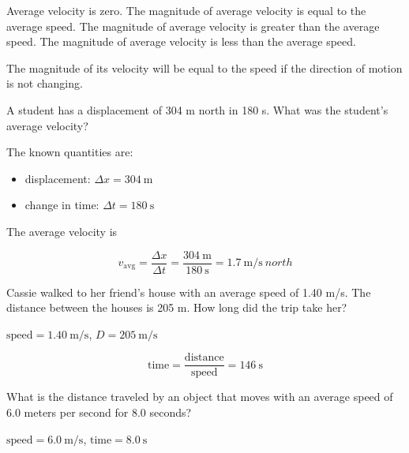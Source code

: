 \documentclass[]{exam}
\begin{document}
\begin{questions}
\begin{choices}
\choice Average velocity is zero.
\CorrectChoice The magnitude of average velocity is equal to the average speed.
\choice The magnitude of average velocity is greater than the average speed.
\choice The magnitude of average velocity is less than the average speed.
\end{choices}

\begin{solution}
The magnitude of its velocity will be equal to the speed if the direction of motion is not changing.
\end{solution}


\question
A student has a displacement of 304 m north in 180 s. What was the student's average velocity?

\begin{solution}
The known quantities are:

\begin{itemize}
    \item displacement: $\Delta{x} = \SI{304}{\meter}$
    \item change in time: $\Delta{t} = \SI{180}{\second}$
\end{itemize}

The average velocity is

\begin{equation*}
    v_{\mathrm{avg}} = \frac{\Delta{x}}{\Delta{t}} = \frac{\SI{304}{\meter}}{\SI{180}{\second}} = \SI[per-mode=symbol]{1.7}{\meter\per\second\ north}
\end{equation*}
\end{solution}



\question
Cassie walked to her friend’s house with an average speed of 1.40 m/s. The distance between the houses is 205 m. How long did the trip take her?

\begin{solution}
    $\text{speed} = \SI{1.40}{\meter/\second}$, $D = \SI{205}{\meter/\second}$

\begin{equation*}
    \text{time} = \frac{\text{distance}}{\text{speed}} = \SI{146}{\second}
\end{equation*}
\end{solution}

\question
What is the distance traveled by an object that moves with an average speed of 6.0 meters per second for 8.0 seconds?

\begin{solution}
    $\text{speed} = \SI{6.0}{\meter/\second}$, $\text{time} = \SI{8.0}{\second}$


\end{solution}
\end{questions}
\end{document}
